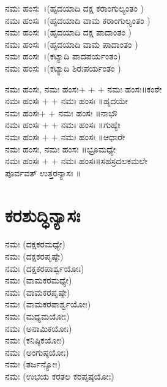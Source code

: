  ನಮಃ ಹಂಸಃ~।(ಹೃದಯಾದಿ ದಕ್ಷ ಕರಾಂಗುಲ್ಯಂತಂ )\\
 ನಮಃ ಹಂಸಃ~।(ಹೃದಯಾದಿ ವಾಮ ಕರಾಂಗುಲ್ಯಂತಂ )\\
 ನಮಃ ಹಂಸಃ~।(ಹೃದಯಾದಿ ದಕ್ಷ ಪಾದಾಂತಂ )\\
 ನಮಃ ಹಂಸಃ~।(ಹೃದಯಾದಿ ವಾಮ ಪಾದಾಂತಂ )\\
 ನಮಃ ಹಂಸಃ~।(ಕಟ್ಯಾದಿ ಪಾದಪರ್ಯಂತಂ)\\
 ನಮಃ ಹಂಸಃ~।(ಕಟ್ಯಾದಿ ಶಿರಃಪರ್ಯಂತಂ )\\

 ನಮಃ ಹಂಸಃ,  ನಮಃ ಹಂಸಃ+ + + ನಮಃ ಹಂಸಃ॥ಕಂಠೇ\\
 ನಮಃ ಹಂಸಃ + +  ನಮಃ ಹಂಸಃ ॥ಹೃದಯೇ\\
 ನಮಃ ಹಂಸಃ+ +  ನಮಃ ಹಂಸಃ ॥ನಾಭೌ\\
 ನಮಃ ಹಂಸಃ + +  ನಮಃ ಹಂಸಃ ॥ಗುಹ್ಯೇ\\
 ನಮಃ ಹಂಸಃ + +  ನಮಃ ಹಂಸಃ ॥ಆಧಾರೇ\\
 ನಮಃ ಹಂಸಃ,  ನಮಃ ಹಂಸಃ ॥ಭ್ರೂಮಧ್ಯೇ\\
 ನಮಃ ಹಂಸಃ + + ನಮಃ ಹಂಸಃ॥ಸಹಸ್ರದಲಕಮಲೇ\\
 ಪೂರ್ವವತ್ ಉತ್ತರನ್ಯಾಸಃ ॥
\section{ಕರಶುದ್ಧಿನ್ಯಾಸಃ}
 ನಮಃ (ದಕ್ಷಕರಮಧ್ಯೇ)\\
 ನಮಃ (ದಕ್ಷಕರಪೃಷ್ಠೇ)\\
 ನಮಃ (ದಕ್ಷಕರಪಾರ್ಶ್ವಯೋಃ)\\
 ನಮಃ (ವಾಮಕರಮಧ್ಯೇ)\\
 ನಮಃ (ವಾಮಕರಪೃಷ್ಠೇ)\\
 ನಮಃ (ವಾಮಕರಪಾರ್ಶ್ವಯೋಃ)\\
 ನಮಃ (ಮಧ್ಯಮಯೋಃ)\\
 ನಮಃ (ಅನಾಮಿಕಯೋಃ)\\
 ನಮಃ (ಕನಿಷ್ಠಿಕಯೋಃ)\\
 ನಮಃ (ಅಂಗುಷ್ಠಯೋಃ)\\
 ನಮಃ (ತರ್ಜನ್ಯೋಃ)\\
 ನಮಃ (ಉಭಯ ಕರತಲ ಕರಪೃಷ್ಠಯೋಃ)

